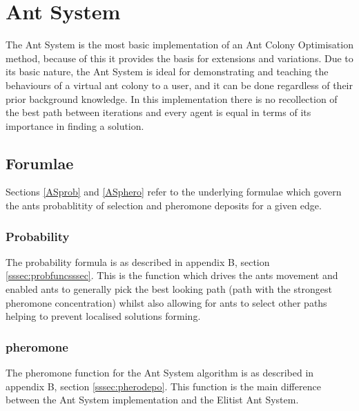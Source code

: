 \section{Ant System}
\label{sec:AntSystem}
The Ant System is the most basic implementation of an Ant Colony Optimisation method, because of this it provides the basis for extensions and variations. Due to its basic nature, the Ant System is ideal for demonstrating and teaching the behaviours of a virtual ant colony to a user, and it can be done regardless of their prior background knowledge. In this implementation there is no recollection of the best path between iterations and every agent is equal in terms of its importance in finding a solution.

\subsection{Forumlae}

Sections \ref{ASprob} and \ref{ASphero} refer to the underlying formulae which govern the ants probablitity of selection and pheromone deposits for a given edge.

\subsubsection{Probability}

The probability formula is as described in appendix B, section \ref{sssec:probfuncsssec}. This is the function which drives the ants movement and enabled ants to generally pick the best looking path (path with the strongest pheromone concentration) whilst also allowing for ants to select other paths helping to prevent localised solutions forming.

\label{ASprob}

\subsubsection{pheromone}

The pheromone function for the Ant System algorithm is as described in appendix B, section \ref{sssec:pherodepo}. This function is the main difference between the Ant System implementation and the Elitist Ant System.

\label{ASphero}

